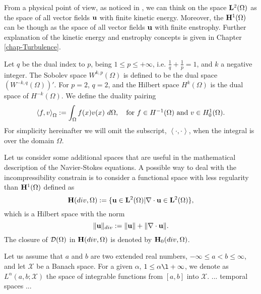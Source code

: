 From a physical point of view, as noticed in \cite{Foias}, we can think on the space ${\bf L}^2(\Omega)$ as the space of all vector fields ${\bf u}$ with finite kinetic energy. Moreover, the ${\bf H}^1(\Omega)$ can be though as the space of all vector fields ${\bf u}$ with finite enstrophy. Further explanation of the kinetic energy and enstrophy concepts is given in Chapter \ref{chap-Turbulence}.

Let $ q $ be the dual index to $ p $, being $ 1\le p\le+\infty $, i.e. $ \frac{1}{q}+\frac{1}{p}=1 $, and $ k $ a negative integer. The Sobolev space $ W^{k,p}(\Omega) $ is defined to be the dual space $ \left(W^{-k,q}(\Omega)\right)' $. For $ p=2 $, $ q=2 $, and the Hilbert space $ H^k(\Omega) $ is the dual space of $ H^{-k}(\Omega) $. We define the duality pairing 
$$ \left\langle f,v\right\rangle_\Omega:=\int_{\Omega}f(x)v(x)\ d\Omega,\quad\mbox{for $ f\in H^{-1}(\Omega) $ and $ v\in H^1_0(\Omega) $}. $$
For simplicity hereinafter we will omit the subscript, $ \left\langle\cdot,\cdot\right\rangle $, when the integral is over the domain $ \Omega $.

Let us consider some additional spaces that are useful in the mathematical description of the Navier-Stokes equations. A possible way to deal with the incompressibility constrain  is to consider a functional space with less regularity than ${\bf H}^1(\Omega)$ defined as
$${\bf H}(div,\Omega):=\{{\bf u}\in{\bf L}^2(\Omega)|\nabla\cdot{\bf u}\in{\bf L}^2(\Omega)\},$$
which is a Hilbert space with the norm
$$\|{\bf u}\|_{div}:=\|{\bf u}\|+\|\nabla\cdot{\bf u}\|.$$
The closure of $\mathcal{D}(\Omega)$ in ${\bf H}(div,\Omega)$ is denoted by ${\bf H}_0(div,\Omega)$.

Let us assume that $ a $ and $ b $ are two extended real numbers, $ -\infty\le a < b\le\infty $, and let $ \mathcal{X} $ be a Banach space. For a given $ \alpha $, $ 1\le\alpha\l +\infty $, we denote as $ L^\alpha(a,b;\mathcal{X}) $ the space of integrable functions from $ \left[a,b\right] $ into $ \mathcal{X} $.
... temporal spaces ...